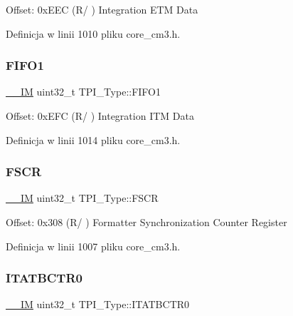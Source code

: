 Offset\+: 0x\+E\+EC (R/ ) Integration E\+TM Data 

Definicja w linii 1010 pliku core\+\_\+cm3.\+h.

\mbox{\label{struct_t_p_i___type_a061372fcd72f1eea871e2d9c1be849bc}} 
\subsubsection{\texorpdfstring{F\+I\+F\+O1}{FIFO1}}
{\footnotesize\ttfamily \hyperlink{core__sc300_8h_a4cc1649793116d7c2d8afce7a4ffce43}{\+\_\+\+\_\+\+IM} uint32\+\_\+t T\+P\+I\+\_\+\+Type\+::\+F\+I\+F\+O1}

Offset\+: 0x\+E\+FC (R/ ) Integration I\+TM Data 

Definicja w linii 1014 pliku core\+\_\+cm3.\+h.

\mbox{\label{struct_t_p_i___type_ad6901bfd8a0089ca7e8a20475cf494a8}} 
\subsubsection{\texorpdfstring{F\+S\+CR}{FSCR}}
{\footnotesize\ttfamily \hyperlink{core__sc300_8h_a4cc1649793116d7c2d8afce7a4ffce43}{\+\_\+\+\_\+\+IM} uint32\+\_\+t T\+P\+I\+\_\+\+Type\+::\+F\+S\+CR}

Offset\+: 0x308 (R/ ) Formatter Synchronization Counter Register 

Definicja w linii 1007 pliku core\+\_\+cm3.\+h.

\mbox{\label{struct_t_p_i___type_aaa573b2e073e76e93c51ecec79c616d0}} 
\subsubsection{\texorpdfstring{I\+T\+A\+T\+B\+C\+T\+R0}{ITATBCTR0}}
{\footnotesize\ttfamily \hyperlink{core__sc300_8h_a4cc1649793116d7c2d8afce7a4ffce43}{\+\_\+\+\_\+\+IM} uint32\+\_\+t T\+P\+I\+\_\+\+Type\+::\+I\+T\+A\+T\+B\+C\+T\+R0}

